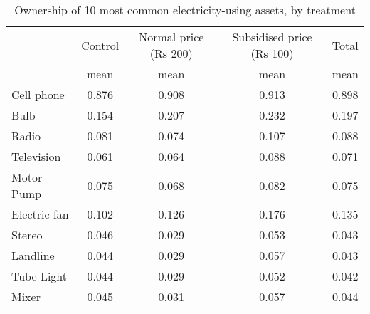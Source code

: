 \begin{table}[htbp]\centering
\def\sym#1{\ifmmode^{#1}\else\(^{#1}\)\fi}
\caption{Ownership of 10 most common electricity-using assets, by treatment \label{tab:"label"}}
\begin{tabular*}{0.9\hsize}{@{\hskip\tabcolsep\extracolsep\fill}l*{4}{c}}
\toprule
                                &  Control&Normal price (Rs 200)&Subsidised price (Rs 100)&    Total\\
                                &     mean&     mean&     mean&     mean\\
\midrule
Cell phone                      &    0.876&    0.908&    0.913&    0.898\\
Bulb                            &    0.154&    0.207&    0.232&    0.197\\
Radio                           &    0.081&    0.074&    0.107&    0.088\\
Television                      &    0.061&    0.064&    0.088&    0.071\\
Motor Pump                      &    0.075&    0.068&    0.082&    0.075\\
Electric fan                    &    0.102&    0.126&    0.176&    0.135\\
Stereo                          &    0.046&    0.029&    0.053&    0.043\\
Landline                        &    0.044&    0.029&    0.057&    0.043\\
Tube Light                      &    0.044&    0.029&    0.052&    0.042\\
Mixer                           &    0.045&    0.031&    0.057&    0.044\\
\bottomrule
\end{tabular*}
\end{table}
